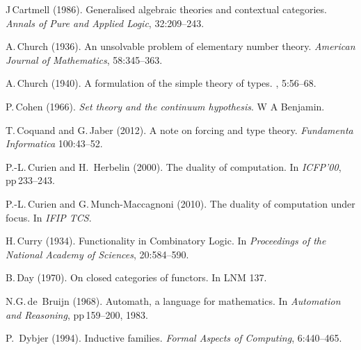\documentclass[11pt,twocolumn]{article}
\begin{document}
{\begin{thebibliography}{000}
J\,Cartmell (1986).
\newblock Generalised algebraic theories and contextual categories.
\newblock \emph{Annals of Pure and Applied Logic}, 32:209--243.


A.\,Church (1936).
\newblock An unsolvable problem of elementary number theory.
\newblock \emph{American Journal of Mathematics}, 58:345--363. 

A.\,Church (1940).
\newblock A formulation of the simple theory of types.
, 5:56--68. 
  
P.\,Cohen (1966).
\newblock \emph{Set theory and the continuum hypothesis}.
\newblock W A Benjamin.

T.\,Coquand and G.\,Jaber (2012).
\newblock A note on forcing and type theory.
\newblock \emph{Fundamenta Informatica} 100:43--52.


P.-L.\,Curien and H.\, Herbelin (2000).
\newblock The duality of computation.
\newblock In \emph{ICFP'00}, pp\,233--243.

P.-L.\,Curien and G.\,Munch-Maccagnoni (2010).
\newblock The duality of computation under focus.
\newblock In \emph{IFIP TCS}.

H.\,Curry (1934).
\newblock Functionality in Combinatory Logic.
\newblock In \emph{Proceedings of the National Academy of Sciences},
  20:584--590.

B.\,Day (1970).
\newblock On closed categories of functors.
\newblock In LNM 137. 

N.G.\,de~Bruijn (1968).
\newblock Automath, a language for mathematics.
\newblock In \emph{Automation and Reasoning}, pp\,159--200, 1983.

P.~Dybjer (1994).
\newblock Inductive families.
\newblock \emph{Formal Aspects of Computing}, 6:440--465.


\end{thebibliography}}
\end{document}
